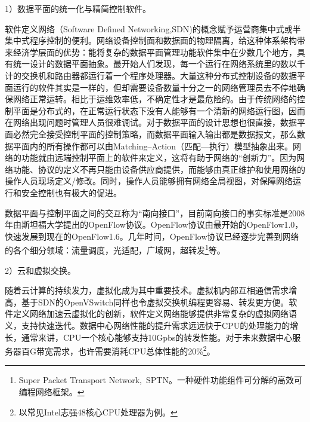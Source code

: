 

1）数据平面的统一化与精简控制软件。

软件定义网络（Software Defined Networking,SDN)的概念赋予运营商集中式或半集中式程序控制的便利。网络设备控制面和数据面的物理隔离，给这种体系架构带来经济学层面的优势：能将复杂的数据平面管理功能软件集中在少数几个地方，具有统一设计的数据平面抽象。最开始人们发现，每一个运行在网络系统里的数以千计的交换机和路由器都运行着一个程序处理器。大量这种分布式控制设备的数据平面运行的软件其实是一样的，但却需要设备数量十分之一的网络管理员去不停地确保网络正常运转。相比于运维效率低，不确定性才是最危险的。由于传统网络的控制平面是分布式的，在正常运行状态下没有人能够有一个清新的网络运行图，因而在网络出现问题时管理人员很难调试。对于数据平面的设计思想也很直接，数据平面必然完全接受控制平面的控制策略，而数据平面输入输出都是数据报文，那么数据平面内的所有操作都可以由Matching--Action（匹配---执行）模型抽象出来。网络的功能就由远端控制平面上的软件来定义，这将有助于网络的“创新力”。因为网络功能、协议的定义不再只能由设备供应商提供，而能够由真正维护和使用网络的操作人员现场定义/修改。同时，操作人员能够拥有网络全局视图，对保障网络运行和安全控制也有极大的促进。

数据平面与控制平面之间的交互称为“南向接口”，目前南向接口的事实标准是2008年由斯坦福大学提出的OpenFlow协议。OpenFlow协议由最开始的OpenFlow1.0，快速发展到现在的OpenFlow1.6。几年时间，OpenFlow协议已经逐步完善到网络的各个细分领域：流量调度，光适配，广域网，超转发\footnote{Super Packet Transport Network,~SPTN。一种硬件功能组件可分解的高效可编程网络框架。}等。

2）云和虚拟交换。

随着云计算的持续发力，虚拟化成为其中重要技术。虚拟机内部互相通信需求增高，基于SDN的OpenVSwitch同样也令虚拟交换机编程更容易、转发更方便。软件定义网络加速云虚拟化的创新，软件定义网络能够提供非常复杂的虚拟网络语义，支持快速迭代。数据中心网络性能的提升需求远远快于CPU的处理能力的增长，通常来讲，CPU一个核心能够支持10Gpbs的转发性能。对于未来数据中心服务器百G带宽需求，也许需要消耗CPU总体性能的20\%\footnote{以常见Intel志强48核心CPU处理器为例。}。



